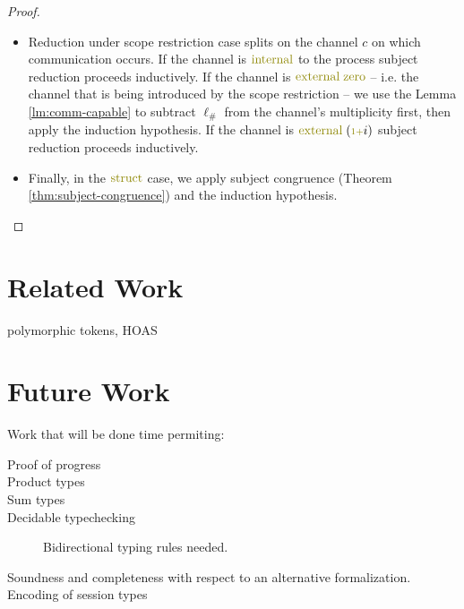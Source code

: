 \documentclass[a4paper,UKenglish,cleveref, autoref, thm-restate,authorcolumns]{lipics-v2019}
\theoremstyle{definition}
\newcommand{\constr}[1]{\textcolor{olive}{\operatorname{#1}}}
\newcommand{\suc}{\constr{\scriptstyle 1+}}
\newcommand{\lio}{\ell_{\#}}
\begin{document}
\begin{proof}
\begin{itemize}
    \item
    Reduction under scope restriction case splits on the channel $c$ on which communication occurs.
    If the channel is $\constr{internal}$ to the process subject reduction proceeds inductively.
    If the channel is $\constr{external}\; \constr{zero}$ -- i.e. the channel that is being introduced by the scope restriction -- we use the Lemma \ref{lm:comm-capable} to subtract $\lio$ from the channel's multiplicity first, then apply the induction hypothesis.
    If the channel is $\constr{external}\; (\suc i)$ subject reduction proceeds inductively.

    \item
    Finally, in the $\constr{struct}$ case, we apply subject congruence (Theorem \ref{thm:subject-congruence}) and the induction hypothesis.
  \end{itemize}
\end{proof}

\section{Related Work}

\cite{previous-work} polymorphic tokens, HOAS

\cite{typing-with-leftovers}

\cite{Higher-inductive-types-for-congruence}

\cite{LTS-semantics}

\cite{work-on-session-types}


\section{Future Work}

Work that will be done time permiting:

\begin{description}

\item [Proof of progress]

\item [Product types]

\item [Sum types]

\item [Decidable typechecking]

  Bidirectional typing rules needed.

\item [Soundness and completeness with respect to an alternative formalization.]

\item [Encoding of session types]

\end{description}

\newpage

\end{document}
